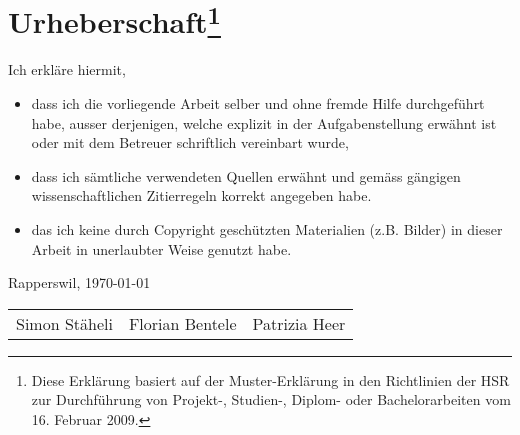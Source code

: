 \chapter{Urheberschaft\footnote{Diese Erklärung basiert auf der Muster-Erklärung in den Richtlinien der HSR zur Durchführung von Projekt-, Studien-, Diplom- oder Bachelorarbeiten vom 16. Februar 2009.}}

Ich erkläre hiermit, 
\begin{itemize}
	\item dass ich die vorliegende Arbeit selber und ohne fremde Hilfe durchgeführt habe, ausser derjenigen, welche explizit in der Aufgabenstellung erwähnt ist oder mit dem Betreuer schriftlich vereinbart wurde,
	\item dass ich sämtliche verwendeten Quellen erwähnt und gemäss gängigen wissenschaftlichen Zitierregeln korrekt angegeben habe.
	\item das ich keine durch Copyright geschützten Materialien (z.B. Bilder) in dieser Arbeit in unerlaubter Weise genutzt habe. 
\end{itemize}

Rapperswil, \today

\vspace{10 mm}
\begin{tabular}{lll}
\hline
Simon Stäheli & Florian Bentele & Patrizia Heer \\
\end{tabular}